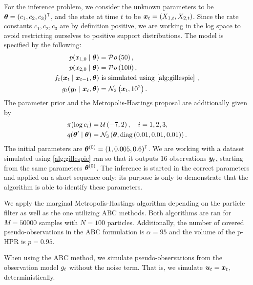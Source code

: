 For the inference problem, we consider the unknown parameters to be $\bm{\theta} = \left(c_1, c_2, c_3\right)^\intercal$, and the state at time $t$ to be $\bm{x}_t = \left(X_{1,t}, X_{2,t}\right)$. Since the rate constants $c_1, c_2, c_3$ are by definition positive, we are working in the log space to avoid restricting ourselves to positive support distributions. The model is specified by the following:
\begin{equation*}
\begin{split}
\sprior(x_{1,0} \mid \btheta) &= \mathcal{P}\mathit{o}\left(50\right), \\
\sprior(x_{2,0} \mid \btheta) &= \mathcal{P}\mathit{o}\left(100\right), \\
\trans_t(\bx_t \mid \bx_{t-1}, \btheta) & \text{ is simulated using \autoref{alg:gillespie} }, \\
\obs_t(\by_t \mid \bx_{t}, \btheta) &= \mathcal{N}_2\left(\bx_t, 10^2\right).
\end{split}
\end{equation*}
The parameter prior and the Metropolis-Hastings proposal are additionally given by
\begin{equation*}
\begin{split}
\pi(\log c_i) &= \mathcal{U}\left(-7, 2\right), \quad i = 1, 2, 3, \\
q(\bm{\theta}^\prime \mid \bm{\theta}) &= \mathcal{N}_3\left(\bm{\theta}, \text{diag}\left(0.01, 0.01, 0.01\right)\right).
\end{split}
\end{equation*}
The initial parameters are $\bm{\theta}^{(0)} = \left(1, 0.005, 0.6\right)^\intercal$. We are working with a dataset simulated using \autoref{alg:gillespie} ran so that it outputs 16 observations $\bm{y}_t$, starting from the same parameters $\bm{\theta}^{(0)}$. The inference is started in the correct parameters and applied on a short sequence only; its purpose is only to demonstrate that the algorithm is able to identify these parameters.

We apply the marginal Metropolis-Hastings algorithm depending on the particle filter as well as the one utilizing ABC methods. Both algorithms are ran for $M = 50000$ samples with $N = 100$ particles. Additionally, the number of covered pseudo-observations in the ABC formulation is $\alpha = 95$ and the volume of the p-HPR is $p = 0.95$.

When using the ABC method, we simulate pseudo-observations from the observation model $g_t$ without the noise term. That is, we simulate $\bm{u}_t = \bm{x}_t$, deterministically.


